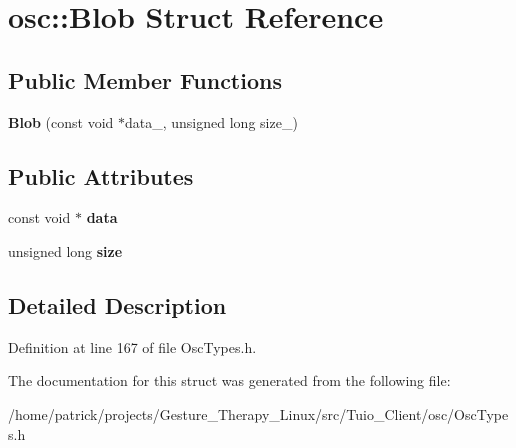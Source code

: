 \hypertarget{structosc_1_1_blob}{}\section{osc\+:\+:Blob Struct Reference}
\label{structosc_1_1_blob}
\subsection*{Public Member Functions}
\begin{DoxyCompactItemize}
\item 
\mbox{\label{structosc_1_1_blob_a53cfb30db8ea109d566304e8aedbd93a}} 
{\bfseries Blob} (const void $\ast$data\+\_\+, unsigned long size\+\_\+)
\end{DoxyCompactItemize}
\subsection*{Public Attributes}
\begin{DoxyCompactItemize}
\item 
\mbox{\label{structosc_1_1_blob_a2caca840659f8af10a8dfb98c15353e5}} 
const void $\ast$ {\bfseries data}
\item 
\mbox{\label{structosc_1_1_blob_abce343ce9e3f525a1dc60ec7baae06e8}} 
unsigned long {\bfseries size}
\end{DoxyCompactItemize}


\subsection{Detailed Description}


Definition at line 167 of file Osc\+Types.\+h.



The documentation for this struct was generated from the following file\+:\begin{DoxyCompactItemize}
\item 
/home/patrick/projects/\+Gesture\+\_\+\+Therapy\+\_\+\+Linux/src/\+Tuio\+\_\+\+Client/osc/Osc\+Types.\+h\end{DoxyCompactItemize}

